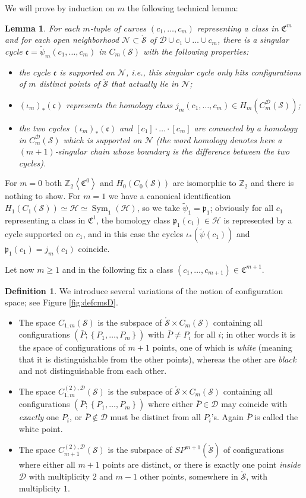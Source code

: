 \documentclass{amsart}
\theoremstyle{plain}
\newtheorem{lem}[thm]   {Lemma}
\theoremstyle{definition}
\newtheorem{defn}[thm]  {Definition}
\newcommand{\cC}{\mathfrak{C}}
\newcommand{\fc}{\mathfrak{c}}
\newcommand{\D}{\mathcal{D}}
\renewcommand{\H}{\mathcal{H}}
\newcommand{\N}{\mathcal{N}}
\renewcommand{\S}{\mathcal{S}}
\newcommand{\Z}{\mathbb{Z}}
\newcommand{\cms}{C_m(\S)}
\newcommand{\cmsD}{C_{m}^{\D}(\S)}
\newcommand{\fmstwoD}{C_{1,m}^{(2),\D}(\S)}
\newcommand{\cmstwoD}{C_{m+1}^{(2),\D}(\S)}
\renewcommand{\j}{j}
\newcommand{\pr}{\mathfrak{p}}
\newcommand{\ZcC}[1]{\Z_2\left<\cC^{#1}\right>}
\newcommand{\tpsi}{\tilde\psi}
\newcommand{\pa}[1]{\left(#1\right)}
\newcommand{\set}[1]{\left\{#1\right\}}
\newcommand{\mrS}{\mathring{\S}}
\newcommand{\SP}{S\!P}
\DeclareMathOperator{\Sym}{Sym}
\begin{document}
We will prove by induction on $m$ the following technical lemma:

\begin{lem}
 \label{lem:tpsiwithproperties}
For each $m$-tuple of curves $(c_1,\dots,c_m)$ representing a class in $\cC^m$
and for each open neighborhood $\N\subset\mrS$ of
$\D\cup c_1\cup\dots\cup c_m$, there is a singular cycle $\fc=\tpsi_m(c_1,\dots,c_m)$
in $\cms$ with the following properties:
\begin{itemize}
 \item the cycle $\fc$ is \emph{supported} on $\N$, i.e.,
this singular cycle only hits configurations of $m$ distinct points of $\mrS$ that actually lie in $\N$;
\item $\pa{\iota_m}_*(\fc)$ represents the homology class $\j_m(c_1,\dots,c_m)\in H_m\pa{\cmsD}$;
\item the two cycles $\pa{\iota_m}_*(\fc)$ and $[c_1]\cdot\ldots\cdot[c_m]$
are connected by a homology in $\cmsD$ which is supported on $\N$ (the word
\emph{homology} denotes here a $(m+1)$-singular chain whose boundary is the difference between the two cycles).
\end{itemize}
\end{lem}

For $m=0$ both $\ZcC{0}$ and $H_0(C_0(\S))$ are
isomorphic to $\Z_2$ and there is nothing to show. For $m=1$
we have a canonical identification $H_1(C_1(\S))\simeq\H\simeq\Sym_1(\H)$, so we take $\tpsi_1=\pr_1$;
obviously for all $c_1$ representing a class in $\cC^1$, the homology class $\pr_1(c_1)\in\H$
is represented by a cycle supported on $c_1$,
and in this case the cycles $\iota_*\pa{\tpsi(c_1)}$ and $\pr_1(c_1)=\j_m(c_1)$ coincide.

Let now $m\geq 1$ and in the following fix a class $(c_1,\dots, c_{m+1})\in\cC^{m+1}$.

\begin{defn}
\label{defn:variationsCm}
We introduce several variations of the notion of configuration space; see Figure \ref{fig:defcmsD}.
\begin{itemize} 
 \item The space $C_{1,m}(\S)$ is the subspace of $\mrS\times \cms$ containing all configurations
 $\pa{\bar P;\set{P_1,\dots,P_m}}$ with $\bar P\neq P_i$ for all $i$; in other words it is
 the space of configurations of $m+1$ points, one of which is \emph{white} (meaning that
 it is distinguishable from the other points), whereas the other are \emph{black} and not distinguishable
 from each other.
 \item The space $\fmstwoD$ is the subspace of $\mrS\times\cms$ containing all configurations
 $\pa{\bar P;\set{P_1,\dots, P_m}}$ where either $\bar P\in\D$ may coincide with \emph{exactly}
 one $P_i$, or
 $\bar P\not\in \D$ must be distinct from all $P_i$'s.
 Again $\bar P$ is called the white point.
 \item The space $\cmstwoD$ is the subspace of $\SP^{m+1}(\mrS)$ of configurations where either all $m+1$ points
 are distinct, or there is exactly one point \emph{inside $\D$} with multiplicity $2$ and $m-1$ other points,
 somewhere in $\mrS$, with multiplicity $1$.
\end{itemize}
 \end{defn}
 
\end{document}
